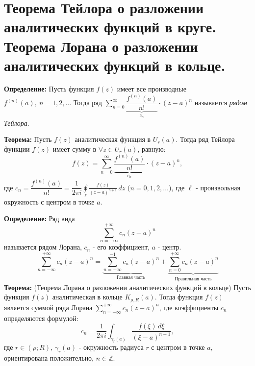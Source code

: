 \section{Теорема Тейлора о разложении аналитических функций в круге.
Теорема Лорана о разложении аналитических функций в
кольце.}\label{ux442ux435ux43eux440ux435ux43cux430-ux442ux435ux439ux43bux43eux440ux430-ux43e-ux440ux430ux437ux43bux43eux436ux435ux43dux438ux438-ux430ux43dux430ux43bux438ux442ux438ux447ux435ux441ux43aux438ux445-ux444ux443ux43dux43aux446ux438ux439-ux432-ux43aux440ux443ux433ux435.-ux442ux435ux43eux440ux435ux43cux430-ux43bux43eux440ux430ux43dux430-ux43e-ux440ux430ux437ux43bux43eux436ux435ux43dux438ux438-ux430ux43dux430ux43bux438ux442ux438ux447ux435ux441ux43aux438ux445-ux444ux443ux43dux43aux446ux438ux439-ux432-ux43aux43eux43bux44cux446ux435.}

\textbf{Определение:} Пусть функция \(f(z)\) имеет все производные
\(f^{(n)}(a), \ n=1,2,\dots\) Тогда ряд
\(\sum\limits_{n=0}^{\infty} \underbrace{\dfrac{f^{(n)}(a)}{n!}}_{c_{n}}\cdot (z-a)^{n}\)
называется \emph{рядом Тейлора}.

\textbf{Теорема:} Пусть \(f(z)\) аналитическая функция в \(U_{r}(a)\).
Тогда ряд Тейлора функции \(f(z)\) имеет сумму в
\(\forall z\in U_{r}(a)\), равную: \[
f(z)=\sum_{n=0}^{\infty} \underbrace{\frac{f^{(n)}(a)}{n!}}_{c_{n}}\cdot (z-a)^{n},
\] где
\(c_{n}= \dfrac{f^{(n)}(a)}{n!}= \dfrac{1}{2\pi i}\oint\limits_{\ell} \frac{f(z)}{(z-a)^{n+1}}\,dz\)
(\(n=0,1,2,\dots\)), где \(\ell\) - произвольная окружность с центром в
точке \(a\).

\textbf{Определение:} Ряд вида \[
\sum_{n=-\infty}^{+\infty}c_{n}(z-a)^{n}
\] называется рядом Лорана, \(c_{n}\) - его коэффициент, \(a\) - центр.
\[
\sum_{n=-\infty}^{+\infty}c_{n}(z-a)^{n}=\underbrace{\sum_{n=-\infty}^{-1}c_{n}(z-a)^{n}}_{\text{Главная часть}}+\underbrace{\sum_{n=0}^{+\infty}c_{n}(z-a)^{n}}_{\substack{\text{Правильная часть}}}
\] \textbf{Теорема:} (Теорема Лорана о разложении аналитических функций
в кольце) Пусть функция \(f(z)\) аналитическая в кольце
\(K_{\rho,R}(a)\). Тогда функция \(f(z)\) является суммой ряда Лорана
\(\sum\limits_{n=-\infty}^{+\infty}c_{n}(z-a)^{n}\), где коэффициенты
\(c_{n}\) определяются формулой: \[
c_{n}= \frac{1}{2\pi i}\int_{\gamma_{r}(a)} \frac{f(\xi)\,d\xi}{(\xi-a)^{n+1}},
\] где \(r\in(\rho;R)\), \(\gamma_{r}(a)\) - окружность радиуса \(r\) с
центром в точке \(a\), ориентирована положительно, \(n\in \mathbb{Z}\).
